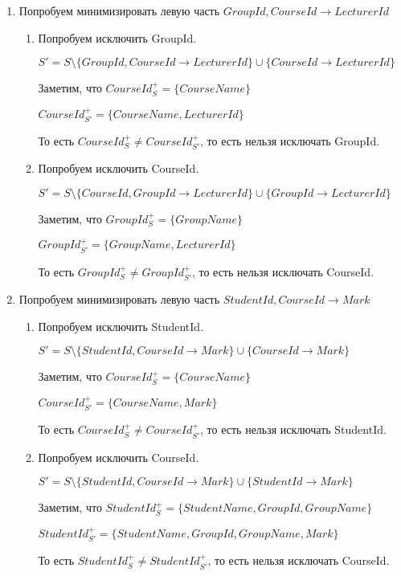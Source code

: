 \documentclass{article}
\begin{document}
	\begin{enumerate}
		\item
		Попробуем минимизировать левую часть $GroupId, CourseId \rightarrow LecturerId$
		
		\begin{enumerate}
			\item
			Попробуем исключить GroupId.
			
			$S' = S \setminus \{GroupId, CourseId \rightarrow LecturerId\} \cup \{CourseId \rightarrow LecturerId\} $
			
			Заметим, что $CourseId^+_S = \{CourseName\}$
			
			$CourseId^+_{S'} =  \{CourseName, LecturerId\}$
			
			То есть $CourseId^+_S \neq CourseId^+_{S'} $, то есть нельзя исключать GroupId.
			
			\item
			Попробуем исключить CourseId.
			
			$S' = S \setminus \{CourseId, GroupId \rightarrow LecturerId\} \cup \{GroupId \rightarrow LecturerId\} $
			
			Заметим, что $GroupId^+_S = \{GroupName\}$
			
			$GroupId^+_{S'} =  \{GroupName, LecturerId\}$
			
			То есть $GroupId^+_S \neq GroupId^+_{S'} $, то есть нельзя исключать CourseId.
		\end{enumerate}
	
		\item 
		Попробуем минимизировать левую часть $StudentId, CourseId \rightarrow Mark$
		
		\begin{enumerate}
			\item
			Попробуем исключить StudentId.
			
			$S' = S \setminus \{StudentId, CourseId \rightarrow Mark\} \cup \{CourseId \rightarrow Mark\} $
			
			Заметим, что $CourseId^+_S = \{CourseName\}$
			
			$CourseId^+_{S'} =  \{CourseName, Mark\}$
			
			То есть $CourseId^+_S \neq CourseId^+_{S'} $, то есть нельзя исключать StudentId.
			
			\item
			Попробуем исключить CourseId.
			
			$S' = S \setminus \{StudentId, CourseId \rightarrow Mark\} \cup \{StudentId \rightarrow Mark\} $
			
			Заметим, что $StudentId^+_S = \{StudentName, GroupId, GroupName\}$
			
			$StudentId^+_{S'} =  \{StudentName, GroupId, GroupName, Mark\}$
			
			То есть $StudentId^+_S \neq StudentId^+_{S'} $, то есть нельзя исключать CourseId.
		\end{enumerate}
	\end{enumerate}
\end{document}
